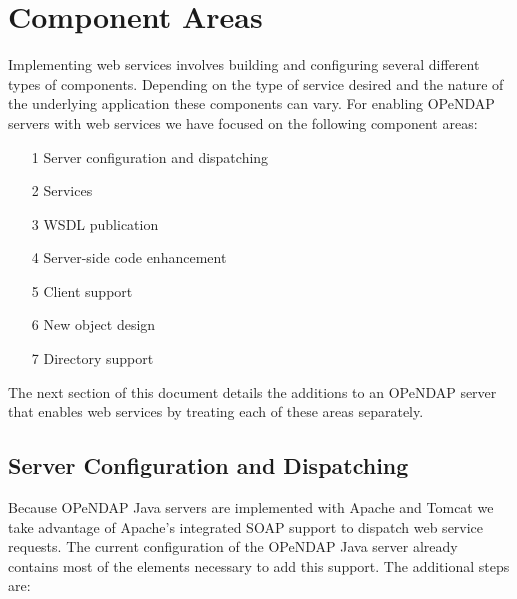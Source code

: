 \documentclass[justify]{dods-paper}
\begin{document}
\section{Component Areas}

Implementing web services involves building and configuring several different types of components. Depending on the type of service desired and the nature of the underlying application these components can vary. For enabling OPeNDAP servers with web services we have focused on the following component areas:

\begin{itemize}
    \item [1] Server configuration and dispatching
    \item [2] Services
    \item [3] WSDL publication
    \item [4] Server-side code enhancement
    \item [5] Client support
    \item [6] New object design
    \item [7] Directory support
\end{itemize}
The next section of this document details the additions to an OPeNDAP 
server that enables web services by treating each of these areas separately.

\subsection{Server Configuration and Dispatching}

Because OPeNDAP Java servers are implemented with Apache and Tomcat we take 
advantage of Apache's integrated SOAP support to dispatch web service 
requests. The current configuration of the OPeNDAP Java server already 
contains most of the elements necessary to add this support. The additional 
steps are:
\end{document}
